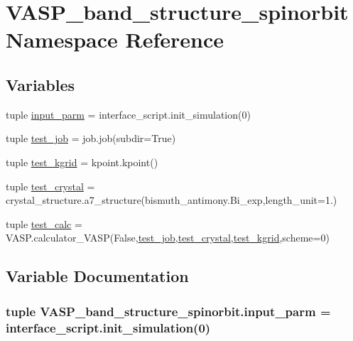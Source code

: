 \hypertarget{namespace_v_a_s_p__band__structure__spinorbit}{\section{V\+A\+S\+P\+\_\+band\+\_\+structure\+\_\+spinorbit Namespace Reference}
\label{namespace_v_a_s_p__band__structure__spinorbit}
}
\subsection*{Variables}
\begin{DoxyCompactItemize}
\item 
tuple \hyperlink{namespace_v_a_s_p__band__structure__spinorbit_a42419730a21662e91dd3057614454602}{input\+\_\+parm} = interface\+\_\+script.\+init\+\_\+simulation(0)
\item 
tuple \hyperlink{namespace_v_a_s_p__band__structure__spinorbit_a7f5e201ba4557ceea897bc3337be338f}{test\+\_\+job} = job.\+job(subdir=True)
\item 
tuple \hyperlink{namespace_v_a_s_p__band__structure__spinorbit_a27cd60622cfcc42b5a5145d09f7ca38f}{test\+\_\+kgrid} = kpoint.\+kpoint()
\item 
tuple \hyperlink{namespace_v_a_s_p__band__structure__spinorbit_a206ed2c3ca40a49bab25c89bbfee0f23}{test\+\_\+crystal} = crystal\+\_\+structure.\+a7\+\_\+structure(bismuth\+\_\+antimony.\+Bi\+\_\+exp,length\+\_\+unit=1.)
\item 
tuple \hyperlink{namespace_v_a_s_p__band__structure__spinorbit_a8647c4dce900e7dfd49db3a8408ed71d}{test\+\_\+calc} = V\+A\+S\+P.\+calculator\+\_\+\+V\+A\+S\+P(False,\hyperlink{namespace_v_a_s_p__band__structure__spinorbit_a7f5e201ba4557ceea897bc3337be338f}{test\+\_\+job},\hyperlink{namespace_v_a_s_p__band__structure__spinorbit_a206ed2c3ca40a49bab25c89bbfee0f23}{test\+\_\+crystal},\hyperlink{namespace_v_a_s_p__band__structure__spinorbit_a27cd60622cfcc42b5a5145d09f7ca38f}{test\+\_\+kgrid},scheme=0)
\end{DoxyCompactItemize}


\subsection{Variable Documentation}
\hypertarget{namespace_v_a_s_p__band__structure__spinorbit_a42419730a21662e91dd3057614454602}{
\subsubsection[{input\+\_\+parm}]{\setlength{\rightskip}{0pt plus 5cm}tuple V\+A\+S\+P\+\_\+band\+\_\+structure\+\_\+spinorbit.\+input\+\_\+parm = interface\+\_\+script.\+init\+\_\+simulation(0)}}\label{namespace_v_a_s_p__band__structure__spinorbit_a42419730a21662e91dd3057614454602}


